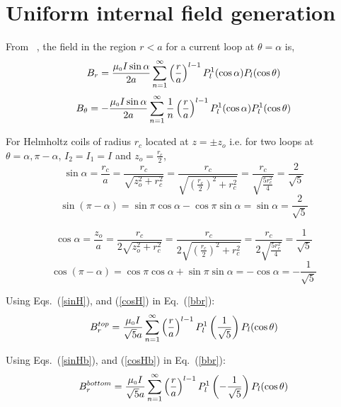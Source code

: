 \section{Uniform internal field generation}
From ~\cite{ smythe}, the field in the region $r< a$ for a current loop at \(\theta=\alpha\) is,
\begin{equation}\label{bbr}
B_r=\frac{\mu_{\scriptscriptstyle 0} I \sin \alpha}{2a}\sum_{n=1}^{\infty} \left(\frac{r}{a}\right)^{l-1}P_l^1(\cos\alpha) P_l(\cos\theta)
\end{equation}
\begin{equation}\label{bbt}
B_\theta=-\frac{\mu_{\scriptscriptstyle 0} I \sin \alpha}{2a}\sum_{n=1}^{\infty} \frac{1}{n}\left(\frac{r}{a}\right)^{l-1}P_l^1(\cos\alpha) P_l^1(\cos\theta)
\end{equation}

For Helmholtz coils of radius \(r_c\) located at \(z=\pm z_o\) i.e. for two loops at \(\theta=\alpha, \pi-\alpha \), \(I_2=I_1=I\) and \(z_o=\frac{r_c}{2}\),
\begin{equation}\label{sinH}
\sin\alpha=\frac{r_c}{a}=\frac{r_c}{\sqrt{z_o^2+r_c^2}}=\frac{r_c}{\sqrt{\left(\frac{r_c}{2}\right)^2+r_c^2}}=\frac{r_c}{\sqrt{\frac{5r_c^2}{4}}}=\frac{2}{\sqrt{5}}
\end{equation}
\begin{equation}\label{sinHb}
\sin(\pi-\alpha)=\sin\pi\cos\alpha-\cos\pi\sin\alpha=\sin\alpha=\frac{2}{\sqrt{5}}
\end{equation}

\begin{equation}\label{cosH}
\cos\alpha=\frac{z_o}{a}=\frac{r_c}{2\sqrt{z_o^2+r_c^2}}=\frac{r_c}{2\sqrt{\left(\frac{r_c}{2}\right)^2+r_c^2}}=\frac{r_c}{2\sqrt{\frac{5r_c^2}{4}}}=\frac{1}{\sqrt{5}}
\end{equation}
\begin{equation}\label{cosHb}
\cos(\pi-\alpha)=\cos\pi\cos\alpha+\sin\pi\sin\alpha=-\cos\alpha=-\frac{1}{\sqrt{5}}
\end{equation}


Using Eqs.~(\ref{sinH}), and (\ref{cosH}) in Eq.~(\ref{bbr}):
\begin{equation}\label{bbrH}
B_r^{top}=\frac{\mu_{\scriptscriptstyle 0} I }{\sqrt{5}a}\sum_{n=1}^{\infty} \left(\frac{r}{a}\right)^{l-1}P_l^1\left(\frac{1}{\sqrt{5}}\right) P_l(\cos\theta)
\end{equation}

Using Eqs.~(\ref{sinHb}), and (\ref{cosHb}) in Eq.~(\ref{bbr}):
\begin{equation}\label{bbrHb}
B_r^{bottom}=\frac{\mu_{\scriptscriptstyle 0} I }{\sqrt{5}a}\sum_{n=1}^{\infty} \left(\frac{r}{a}\right)^{l-1}P_l^1\left(-\frac{1}{\sqrt{5}}\right) P_l(\cos\theta)
\end{equation}


